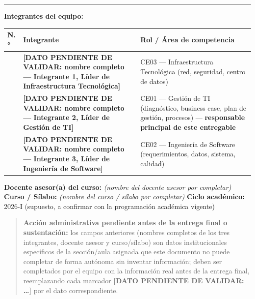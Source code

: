 \documentclass[11pt,a4paper]{article}
\begin{document}
\begin{center}\rule{0.5\linewidth}{0.5pt}\end{center}

\textbf{Integrantes del equipo:}

{\small
\begin{longtable}[]{@{}
  >{\raggedright\arraybackslash}p{}
  >{\raggedright\arraybackslash}p{}
  >{\raggedright\arraybackslash}p{}@{}}
\toprule\noalign{}
\begin{minipage}[b]{\linewidth}\raggedright
N.°
\end{minipage} & \begin{minipage}[b]{\linewidth}\raggedright
Integrante
\end{minipage} & \begin{minipage}[b]{\linewidth}\raggedright
Rol / Área de competencia
\end{minipage} \\
\midrule\noalign{}
\endhead
\bottomrule\noalign{}
\endlastfoot
1 & \textbf{{[}DATO PENDIENTE DE VALIDAR: nombre completo --- Integrante 1, Líder de Infraestructura Tecnológica{]}} & CE03 --- Infraestructura Tecnológica (red, seguridad, centro de datos) \\
2 & \textbf{{[}DATO PENDIENTE DE VALIDAR: nombre completo --- Integrante 2, Líder de Gestión de TI{]}} & CE01 --- Gestión de TI (diagnóstico, business case, plan de gestión, procesos) --- \textbf{responsable principal de este entregable} \\
3 & \textbf{{[}DATO PENDIENTE DE VALIDAR: nombre completo --- Integrante 3, Líder de Ingeniería de Software{]}} & CE02 --- Ingeniería de Software (requerimientos, datos, sistema, calidad) \\
\end{longtable}
}

\textbf{Docente asesor(a) del curso:} \textit{(nombre del docente asesor por completar)}
\textbf{Curso / Sílabo:} \textit{(nombre del curso / s\'ilabo por completar)}
\textbf{Ciclo académico:} 2026-I (supuesto, a confirmar con la programación académica vigente)

\begin{quote}
\textbf{Acción administrativa pendiente antes de la entrega final o sustentación:} los campos anteriores (nombres completos de los tres integrantes, docente asesor y curso/sílabo) son datos institucionales específicos de la sección/aula asignada que este documento no puede completar de forma autónoma sin inventar información; deben ser completados por el equipo con la información real antes de la entrega final, reemplazando cada marcador \textbf{{[}DATO PENDIENTE DE VALIDAR: \ldots{]}} por el dato correspondiente.
\end{quote}
\end{document}
